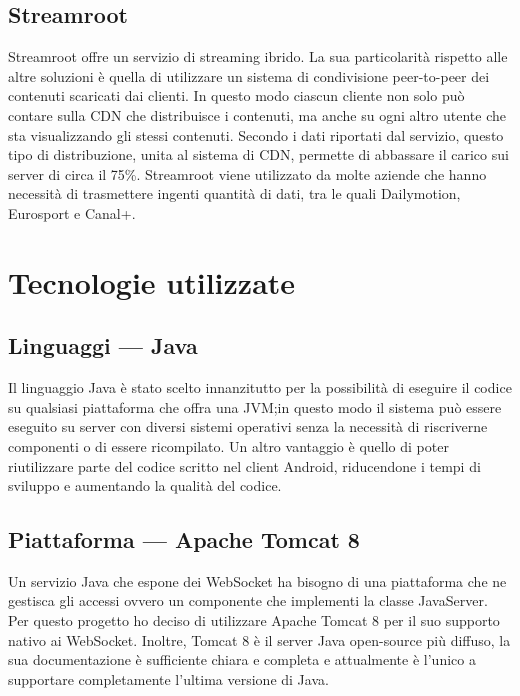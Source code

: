 	\subsection{Streamroot}
	Streamroot offre un servizio di streaming ibrido. La sua particolarità rispetto alle altre soluzioni è quella di utilizzare un sistema di condivisione peer-to-peer dei contenuti scaricati dai clienti. In questo modo ciascun cliente non solo può contare sulla CDN che distribuisce i contenuti, ma anche su ogni altro utente che sta visualizzando gli stessi contenuti. Secondo i dati riportati dal servizio, questo tipo di distribuzione, unita al sistema di CDN, permette di abbassare il carico sui server di circa il 75\%. Streamroot viene utilizzato da molte aziende che hanno necessità di trasmettere ingenti quantità di dati, tra le quali Dailymotion, Eurosport e Canal+.

\section{Tecnologie utilizzate}
	\subsection{Linguaggi --- Java}
	Il linguaggio Java è stato scelto innanzitutto per la possibilità di eseguire il codice su qualsiasi piattaforma che offra una JVM;\@ in questo modo il sistema può essere eseguito su server con diversi sistemi operativi senza la necessità di riscriverne componenti o di essere ricompilato. Un altro vantaggio è quello di poter riutilizzare parte del codice scritto nel client Android, riducendone i tempi di sviluppo e aumentando la qualità del codice.

	\subsection{Piattaforma --- Apache Tomcat 8}
	Un servizio Java che espone dei WebSocket ha bisogno di una piattaforma che ne gestisca gli accessi ovvero un componente che implementi la classe JavaServer. Per questo progetto ho deciso di utilizzare Apache Tomcat 8 per il suo supporto nativo ai WebSocket. Inoltre, Tomcat 8 è il server Java open-source più diffuso, la sua documentazione è sufficiente chiara e completa e attualmente è l'unico a supportare completamente l'ultima versione di Java.

